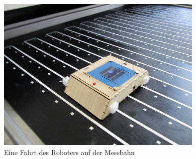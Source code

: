 \documentclass[a4paper,bibtotoc,oneside]{scrbook}
\begin{document}
\begin{figure}[htbp]
\centering
\includegraphics[width=100mm]{img/robofahrt.jpg}
\caption{Eine Fahrt des Roboters auf der Messbahn}\label{robofahrt}
\end{figure}
\end{document}
